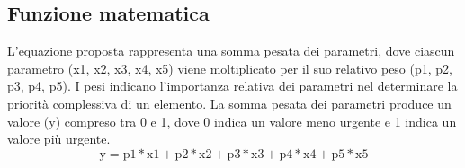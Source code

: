 \subsection{Funzione matematica}
L'equazione proposta rappresenta una somma pesata dei parametri, dove ciascun parametro (x1, x2, x3, x4, x5) viene moltiplicato per il suo relativo peso (p1, p2, p3, p4, p5). I pesi indicano l'importanza relativa dei parametri nel determinare la priorità complessiva di un elemento. La somma pesata dei parametri produce un valore (y) compreso tra 0 e 1, dove 0 indica un valore meno urgente e 1 indica un valore più urgente.
\begin{equation*}
	\text{y} = \text{p1}*{\text{x1}} + \text{p2}*{\text{x2}}  + \text{p3}*{\text{x3}}  + \text{p4}*{\text{x4}}  + \text{p5}*{\text{x5}}
\end{equation*}

\clearpage